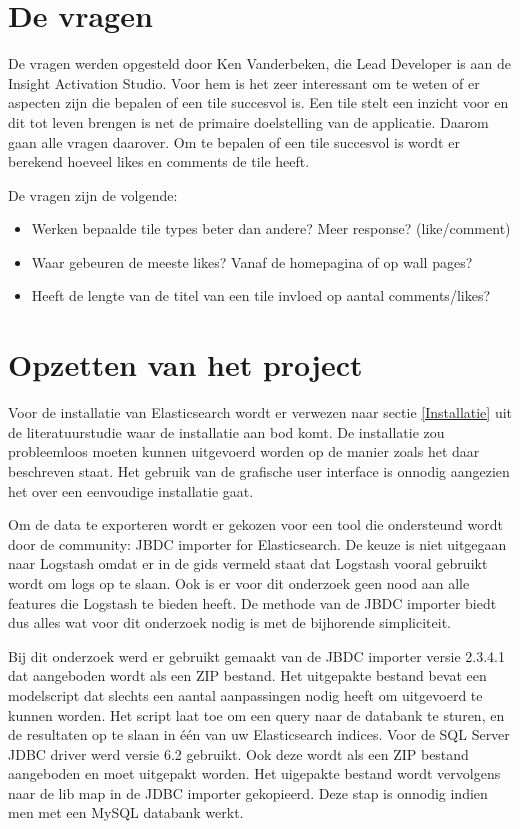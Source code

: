 \section{De vragen}
De vragen werden opgesteld door Ken Vanderbeken, die Lead Developer is aan de Insight Activation Studio. Voor hem is het zeer interessant om te weten of er aspecten zijn die bepalen of een tile succesvol is. Een tile stelt een inzicht voor en dit tot leven brengen is net de primaire doelstelling van de applicatie. Daarom gaan alle vragen daarover. Om te bepalen of een tile succesvol is wordt er berekend hoeveel likes en comments de tile heeft.

De vragen zijn de volgende:
\begin{itemize}
	\item Werken bepaalde tile types beter dan andere? Meer response? (like/comment) 
	\item Waar gebeuren de meeste likes? Vanaf de homepagina of op wall pages?
	\item Heeft de lengte van de titel van een tile invloed op aantal comments/likes? 
\end{itemize}

\section{Opzetten van het project}

Voor de installatie van Elasticsearch wordt er verwezen naar sectie \ref{Installatie} uit de literatuurstudie waar de installatie aan bod komt. De installatie zou probleemloos moeten kunnen uitgevoerd worden op de manier zoals het daar beschreven staat. Het gebruik van de grafische user interface is onnodig aangezien het over een eenvoudige installatie gaat.

Om de data te exporteren wordt er gekozen voor een tool die ondersteund wordt door de community: JBDC importer for Elasticsearch. De keuze is niet uitgegaan naar Logstash omdat er in de gids vermeld staat dat Logstash vooral gebruikt wordt om logs op te slaan. Ook is er voor dit onderzoek geen nood aan alle features die Logstash te bieden heeft. De methode van de JBDC importer biedt dus alles wat voor dit onderzoek nodig is met de bijhorende simpliciteit.

Bij dit onderzoek werd er gebruikt gemaakt van de JBDC importer versie 2.3.4.1 dat aangeboden wordt als een ZIP bestand. Het uitgepakte bestand bevat een modelscript dat slechts een aantal aanpassingen nodig heeft om uitgevoerd te kunnen worden. Het script laat toe om een query naar de databank te sturen, en de resultaten op te slaan in één van uw Elasticsearch indices. Voor de SQL Server JDBC driver werd versie 6.2 gebruikt. Ook deze wordt als een ZIP bestand aangeboden en moet uitgepakt worden. Het uigepakte bestand wordt vervolgens naar de lib map in de JDBC importer gekopieerd. Deze stap is onnodig indien men met een MySQL databank werkt. 

